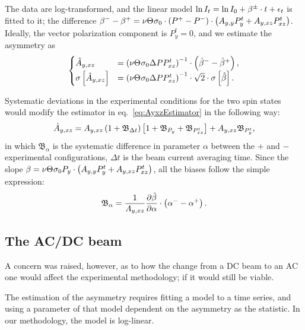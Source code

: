 \documentclass{article}
\newcommand{\bias}[1]{\mathfrak{B}_{#1}}
\begin{document}
The data are log-transformed, and the linear model $\ln I_t = \ln I_0 + \slp^\pm\cdot t + \err_t$ is fitted to it; the difference $\slp^- - \slp^+ = \nu\Thick\CS[0]\cdot\DP*\cdot\bkt{\Ayy P^t_y + \Ayxz P^t_{xz}}$. Ideally, the vector polarization component is $P^t_y = 0$, and we estimate the asymmetry as 
\begin{equation}\label{eq:AyxzEstimator}
\begin{cases}
	\Ayxz* 		&= \bkt{\nu\Thick\CS[0]\DP P^t_{xz}}^{-1}\cdot\bkt{\slp*^- - \slp*^+}, \\
	\SE{\Ayxz*} &= \bkt{\nu\Thick\CS[0]\DP P^t_{xz}}^{-1}\cdot\sqrt2\cdot\SE{\slp*}.
\end{cases}
\end{equation}

\newcommand{\Dt}{\Delta t}
Systematic deviations in the experimental conditions for the two spin states would modify the estimator in eq.~\eqref{eq:AyxzEstimator} in the following way:~\cite{DSPIN}
\begin{equation}\label{eq:AyxzAllBias}
	\Ayxz* = \Ayxz\bkt{1+\bias{\Dt}}\bkt*{1 + \bias{P_y} + \bias{P^t_{xz}}} + \Ayxz\bias{P^t_y},
\end{equation}
in which $\bias{\alpha}$ is the systematic difference in parameter $\alpha$ between the $+$ and $-$ experimental configurations, $\Dt$ is the beam current averaging time. Since the slope $\slp = \nu\Thick\CS[0]P_y\cdot\bkt{\Ayy P^t_y + \Ayxz P^t_{xz}}$, all the biases follow the simple expression:
\begin{equation}
	\bias{\alpha} = \frac{1}{\Ayxz}\frac{\partial\slp*}{\partial\alpha} \cdot \bkt{\alpha^- - \alpha^+}.
\end{equation}

\subsection{The AC/DC beam}

A concern was raised, however, as to how the change from a DC beam to an AC one would affect the experimental methodology; if it would still be viable.

The estimation of the asymmetry requires fitting a model to a time series, and using a parameter of that model dependent on the asymmetry as the statistic. In our methodology, the model is log-linear. 
\end{document}
